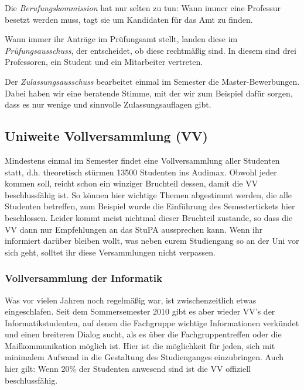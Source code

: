 		Die \emph{Berufungskommission} hat nur selten zu tun: Wann immer eine Professur besetzt werden muss, tagt sie um Kandidaten für das Amt zu finden.

		Wann immer ihr Anträge im Prüfungsamt stellt, landen diese im \emph{Prüfungsausschuss}, der entscheidet, ob diese rechtmäßig sind. In diesem sind drei Professoren, ein Student und ein Mitarbeiter vertreten.

		Der \emph{Zulassungsausschuss} bearbeitet einmal im Semester die Master-Bewerbungen. Dabei haben wir eine beratende Stimme, mit der wir zum Beispiel dafür sorgen, dass es nur wenige und sinnvolle Zulassungsauflagen gibt. 

	\subsection*{Uniweite Vollversammlung (VV)}
		Mindestens einmal im Semester findet eine
		Vollversammlung aller Studenten statt, d.h. theoretisch
		stürmen 13500 Studenten ins Audimax. Obwohl jeder kommen
		soll, reicht schon ein winziger Bruchteil dessen, damit
		die VV beschlussfähig ist. So können hier wichtige
		Themen abgestimmt werden, die alle Studenten betreffen,
		zum Beispiel wurde die Einführung des Semestertickets
		hier beschlossen. Leider kommt meist nichtmal dieser
		Bruchteil zustande, so dass die VV dann nur Empfehlungen
		an das StuPA aussprechen kann. Wenn ihr informiert darüber 
		bleiben wollt, was neben eurem Studiengang so an der Uni vor sich geht, solltet ihr diese Versammlungen nicht verpassen.

		\subsubsection*{Vollversammlung der Informatik}
			Was vor vielen Jahren noch regelmäßig war, ist
			zwischenzeitlich etwas eingeschlafen. Seit dem
			Sommersemester 2010 gibt es aber wieder VV's der
			Informatikstudenten, auf denen die Fachgruppe
			wichtige Informationen verkündet und einen
			breiteren Dialog sucht, als es über die
			Fachgruppentreffen oder die Mailkommunikation
			möglich ist. Hier ist die möglichkeit für jeden,
			sich mit minimalem Aufwand in die Gestaltung des
			Studienganges einzubringen. Auch hier gilt: Wenn
			20\% der Studenten anwesend sind  ist die VV offiziell beschlussfähig.